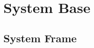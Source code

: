 \documentclass[
english,
ruledheaders=section,%
class=report,%
thesis={type=Report},%
accentcolor=9c,%
custommargins=true,%
marginpar=false,%
parskip=half-,%
fontsize=11pt,%
logofile={img/tuda_logo.pdf}, %
]{tudapub}
\begin{document}



    \chapter{System Base}
    \label{chap:SystemBase}




    \section{System Frame}
    \label{sec:SystemFrame}
\end{document}
